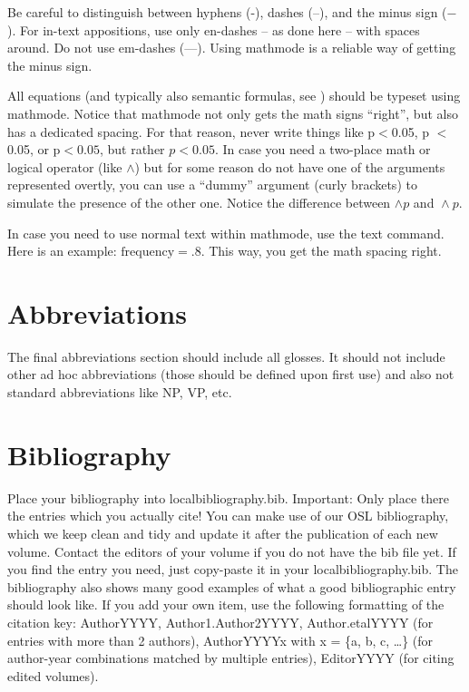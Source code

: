 Be careful to distinguish between hyphens (-), dashes (--), and the minus sign ($-$). For in-text appositions, use only en-dashes -- as done here -- with spaces around. Do not use em-dashes (---). Using mathmode is a reliable way of getting the minus sign.

All equations (and typically also semantic formulas, see ) should be typeset using mathmode. Notice that mathmode not only gets the math signs ``right'', but also has a dedicated spacing. For that reason, never write things like p$<$0.05, p $<$ 0.05, or p$<0.05$, but rather $p<0.05$. In case you need a two-place math or logical operator (like $\wedge$) but for some reason do not have one of the arguments represented overtly, you can use a ``dummy'' argument (curly brackets) to simulate the presence of the other one. Notice the difference between $\wedge p$ and ${}\wedge p$.

In case you need to use normal text within mathmode, use the text command. Here is an example: $\text{frequency}=.8$. This way, you get the math spacing right.

\section{Abbreviations}

The final abbreviations section should include all glosses. It should not include other ad hoc abbreviations (those should be defined upon first use) and also not standard abbreviations like NP, VP, etc.


\section{Bibliography}

Place your bibliography into localbibliography.bib. Important: Only place there the entries which you actually cite! You can make use of our OSL bibliography, which we keep clean and tidy and update it after the publication of each new volume. Contact the editors of your volume if you do not have the bib file yet. If you find the entry you need, just copy-paste it in your localbibliography.bib. The bibliography also shows many good examples of what a good bibliographic entry should look like. If you add your own item, use the following formatting of the citation key: AuthorYYYY, Author1.Author2YYYY, Author.etalYYYY (for entries with more than 2 authors), AuthorYYYYx with x = \{a, b, c, \dots\} (for author-year combinations matched by multiple entries), EditorYYYY (for citing edited volumes).

